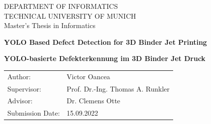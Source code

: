 \begin{titlepage}
  \centering


  \vspace{5mm}
  {\huge\MakeUppercase{Department of Informatics}}\\

  \vspace{5mm}
  {\large\MakeUppercase{Technical University of Munich}}\\

  \vspace{20mm}
  {\Large Master's Thesis in Informatics}

  \vspace{15mm}
  {\huge\bfseries YOLO Based Defect Detection for 3D Binder Jet Printing \par}

  \vspace{10mm}
  {\huge\bfseries {YOLO-basierte Defekterkennung im 3D Binder Jet Druck} \par}

  \vspace{15mm}
  \begin{tabular}{l l}
    Author:          & Victor Oancea \\
    Supervisor:      & Prof. Dr.-Ing. Thomas A. Runkler \\
    Advisor:         & Dr. Clemens Otte \\
    Submission Date: & 15.09.2022 \\
  \end{tabular}

\end{titlepage}
